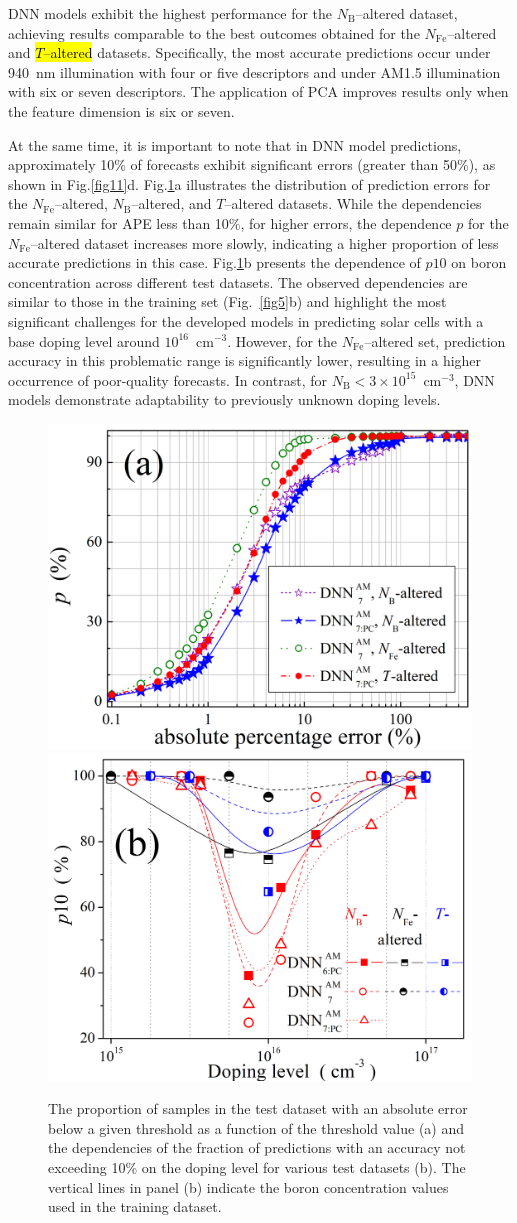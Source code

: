 \documentclass[a4paper,fleqn,draft]{cas-sc}
\begin{document}
DNN models exhibit the highest performance for the $N_\mathrm{B}$--altered dataset,
achieving results comparable to the best outcomes obtained for the $N_\mathrm{Fe}$--altered and
\textcolor[rgb]{1.00,0.07,0.00}{
\hl{$T$--altered}} datasets.
Specifically, the most accurate predictions occur under 940~nm illumination with four or five descriptors
and under AM1.5 illumination with six or seven descriptors.
The application of PCA improves results only when the feature dimension is six or seven.



At the same time, it is important to note that in DNN model predictions, approximately 10\% of forecasts
exhibit significant errors (greater than 50\%), as shown in Fig.\ref{fig11}d.
Fig.\ref{fig12}a illustrates the distribution of prediction errors for the $N_\mathrm{Fe}$--altered, $N_\mathrm{B}$--altered, and $T$--altered datasets.
While the dependencies remain similar for APE less than 10\%, for higher errors,
the dependence $p$ for the $N_\mathrm{Fe}$--altered dataset increases more slowly,
indicating a higher proportion of less accurate predictions in this case.
Fig.\ref{fig12}b presents the dependence of $p10$ on boron concentration across different test datasets.
The observed dependencies are similar to those in the training set (Fig.~\ref{fig5}b)
and highlight the most significant challenges for the developed models in predicting solar cells
with a base doping level around $10^{16}$~cm$^{-3}$.
However, for the $N_\mathrm{Fe}$--altered set, prediction accuracy in this problematic range is significantly lower,
resulting in a higher occurrence of poor-quality forecasts.
In contrast, for $N_\mathrm{B}<3\times10^{15}$~cm$^{-3}$, DNN models demonstrate adaptability to previously unknown doping levels.

\begin{figure}
  \centering
     \includegraphics[width=0.35\linewidth]{Fig12a.png}
     \includegraphics[width=0.35\linewidth]{Fig12b.png}
    \caption{The proportion of samples in the test dataset with an absolute error below a given threshold as a function of the threshold value (a)
    and the dependencies of the fraction of predictions with an accuracy not exceeding 10\% on the doping level for various test datasets (b).
    The vertical lines in panel (b) indicate the boron concentration values used in the training dataset.
}\label{fig12}
\end{figure}
\end{document}
